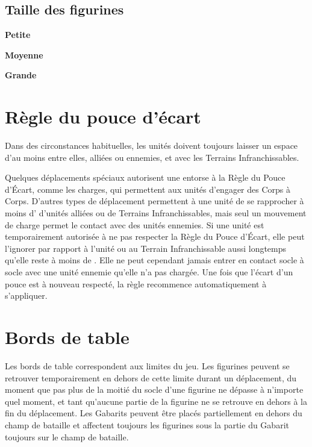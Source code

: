 \subsection{Taille des figurines}
\label{modelheight}


\noindent\textbf{Petite}


\noindent\textbf{Moyenne}


\noindent\textbf{Grande}



\section{Règle du pouce d'écart}

Dans des circonstances habituelles, les unités doivent toujours laisser un espace d'au moins  entre elles, alliées ou ennemies, et avec les Terrains Infranchissables. 

Quelques déplacements spéciaux autorisent une entorse à la Règle du Pouce d'Écart, comme les charges, qui permettent aux unités d'engager des Corps à Corps. D'autres types de déplacement permettent à une unité de se rapprocher à moins d' d'unités alliées ou de Terrains Infranchissables, mais seul un mouvement de charge permet le contact avec des unités ennemies. Si une unité est temporairement autorisée à ne pas respecter la Règle du Pouce d'Écart, elle peut l'ignorer par rapport à l'unité ou au Terrain Infranchissable aussi longtemps qu'elle reste à moins de . Elle ne peut cependant jamais entrer en contact socle à socle avec une unité ennemie qu'elle n'a pas chargée. Une fois que l'écart d'un pouce est à nouveau respecté, la règle recommence automatiquement à s'appliquer.

\section{Bords de table}

Les bords de table correspondent aux limites du jeu. Les figurines peuvent se retrouver temporairement en dehors de cette limite durant un déplacement, du moment que pas plus de la moitié du socle d'une figurine ne dépasse à n'importe quel moment, et tant qu'aucune partie de la figurine ne se retrouve en dehors à la fin du déplacement. Les Gabarits peuvent être placés partiellement en dehors du champ de bataille et affectent toujours les figurines sous la partie du Gabarit toujours sur le champ de bataille.

